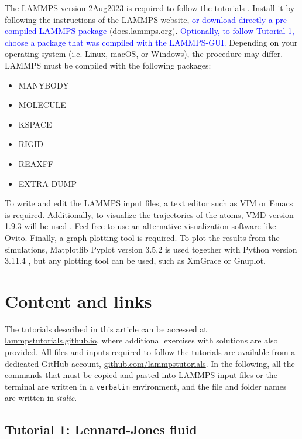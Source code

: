 \documentclass[9pt,tutorial]{livecoms}
\begin{document}
The LAMMPS version 2Aug2023 is required to follow the tutorials \cite{thompson2022lammps}. Install it by following the instructions of the LAMMPS website, \textcolor{blue}{or download directly a pre-compiled LAMMPS package} (\href{https://docs.lammps.org}{docs.lammps.org}). \textcolor{blue}{Optionally, to follow Tutorial 1, choose a package that was compiled with the LAMMPS-GUI.} Depending on your operating system (i.e. Linux, macOS, or Windows), the procedure may differ. LAMMPS must be compiled with the following packages:
\begin{itemize}
\item MANYBODY
\item MOLECULE
\item KSPACE
\item RIGID
\item REAXFF
\item EXTRA-DUMP
\end{itemize}
To write and edit the LAMMPS input files, a text editor such as VIM or Emacs is required. Additionally, to visualize the trajectories of the atoms, VMD version 1.9.3 will be used \cite{humphrey1996vmd}. Feel free to use an alternative visualization software like Ovito. Finally, a graph plotting tool is required. To plot the results from the simulations, Matplotlib Pyplot version 3.5.2 is used together with Python version 3.11.4 \cite{van1995python, hunter2007Matplotlib}, but any plotting tool can be used, such as XmGrace or Gnuplot.

\section{Content and links}

The tutorials described in this article can be accessed at \href{https://lammpstutorials.github.io}{lammpstutorials.github.io}, where additional exercises with solutions are also provided. All files and inputs required to follow the tutorials are available from a dedicated GitHub account, \href{https://github.com/lammpstutorials}{github.com/lammpstutorials}. In the following, all the commands that must be copied and pasted into LAMMPS input files or the terminal are written in a  \verb+verbatim+ environment, and the file and folder names are written in \textit{italic}.

\subsection{Tutorial 1: Lennard-Jones fluid}
\label{lennard-jones-label}
\end{document}
